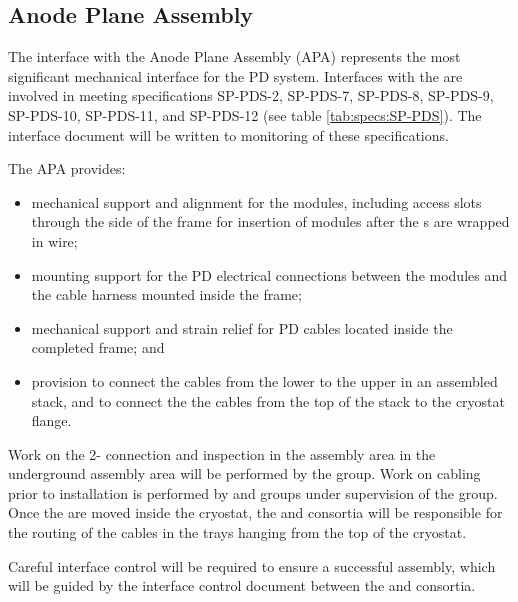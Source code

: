 \subsection{Anode Plane Assembly}

The interface with the Anode Plane Assembly (APA) represents the most significant mechanical interface for the PD system. Interfaces with the  are involved in meeting specifications SP-PDS-2, SP-PDS-7, SP-PDS-8, SP-PDS-9, SP-PDS-10, SP-PDS-11, and SP-PDS-12 (see table \ref{tab:specs:SP-PDS}).  The interface document will be written to monitoring of these specifications.


The APA provides:

\begin{itemize}

\item mechanical support and alignment for the  modules, including access slots through the side of the frame for insertion of modules after the s are wrapped in wire;

\item mounting support for the PD electrical connections between the  modules and the cable harness mounted inside the  frame;

\item mechanical support and strain relief for PD cables located inside the completed  frame; and

\item provision to connect the  cables from the lower  to the upper  in an assembled  stack, and to connect the the 
cables from the top of the  stack to the cryostat flange.

\end{itemize}

Work on the 2- connection and inspection in the assembly area in the underground assembly area will be performed by the  group. Work on cabling prior to installation is performed by  and  groups under supervision of the  group. Once the  are moved inside the cryostat, the  and  consortia will be responsible for the routing of the cables in the trays hanging from the top of the cryostat. 

Careful interface control will be required to ensure a successful assembly, which will be guided by the interface control document between the  and  consortia.  

